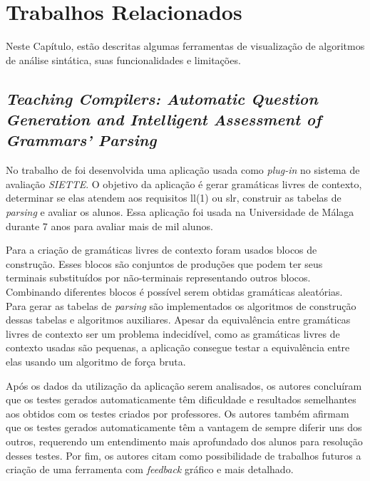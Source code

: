 \chapter{Trabalhos Relacionados}
\label{chap:trabalhos-relacionados}

Neste Capítulo, estão descritas algumas ferramentas de visualização de algoritmos de análise sintática, suas funcionalidades e limitações.

\section{\textit{Teaching Compilers: Automatic Question Generation and Intelligent Assessment of Grammars' Parsing}}
No trabalho de \textcite{munozquestions} foi desenvolvida uma aplicação usada como \textit{plug-in} no sistema de avaliação \textit{SIETTE}. O objetivo da aplicação é gerar gramáticas livres de contexto, determinar se elas atendem aos requisitos \gls{ll}(1) ou \gls{slr}, construir as tabelas de \textit{parsing} e avaliar os alunos. Essa aplicação foi usada na Universidade de Málaga durante 7 anos para avaliar mais de mil alunos.

Para a criação de gramáticas livres de contexto foram usados blocos de construção. Esses blocos são conjuntos de produções que podem ter seus terminais substituídos por não-terminais representando outros blocos. Combinando diferentes blocos é possível serem obtidas gramáticas aleatórias. Para gerar as tabelas de \textit{parsing} são implementados os algoritmos de construção dessas tabelas e algoritmos auxiliares. Apesar da equivalência entre gramáticas livres de contexto ser um problema indecidível, como as gramáticas livres de contexto usadas são pequenas, a aplicação consegue testar a equivalência entre elas usando um algoritmo de força bruta.

Após os dados da utilização da aplicação serem analisados, os autores concluíram que os testes gerados automaticamente têm dificuldade e resultados semelhantes aos obtidos com os testes criados por professores. Os autores também afirmam que os testes gerados automaticamente têm a vantagem de sempre diferir uns dos outros, requerendo um entendimento mais aprofundado dos alunos para resolução desses testes. Por fim, os autores citam como possibilidade de trabalhos futuros a criação de uma ferramenta com \textit{feedback} gráfico e mais detalhado.


